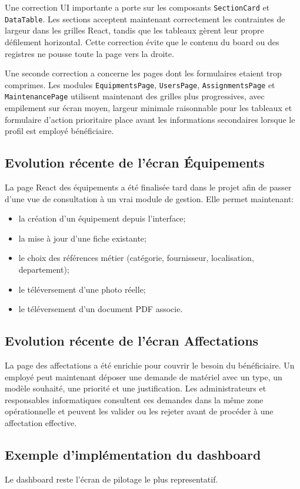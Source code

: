 Une correction UI importante a porte sur les composants \texttt{SectionCard} et \texttt{DataTable}. Les sections acceptent maintenant correctement les contraintes de largeur dans les grilles React, tandis que les tableaux gèrent leur propre défilement horizontal. Cette correction évite que le contenu du board ou des registres ne pousse toute la page vers la droite.

Une seconde correction a concerne les pages dont les formulaires etaient trop comprimes. Les modules \texttt{EquipmentsPage}, \texttt{UsersPage}, \texttt{AssignmentsPage} et \texttt{MaintenancePage} utilisent maintenant des grilles plus progressives, avec empilement sur écran moyen, largeur minimale raisonnable pour les tableaux et formulaire d'action prioritaire place avant les informations secondaires lorsque le profil est employé bénéficiaire.

\subsection{Evolution récente de l'écran Équipements}
La page React des équipements a été finalisée tard dans le projet afin de passer d'une vue de consultation à un vrai module de gestion. Elle permet maintenant:
\begin{itemize}
  \item la création d'un équipement depuis l'interface;
  \item la mise à jour d'une fiche existante;
  \item le choix des références métier (catégorie, fournisseur, localisation, departement);
  \item le téléversement d'une photo réelle;
  \item le téléversement d'un document PDF associe.
\end{itemize}

\subsection{Evolution récente de l'écran Affectations}
La page des affectations a été enrichie pour couvrir le besoin du bénéficiaire. Un employé peut maintenant déposer une demande de matériel avec un type, un modèle souhaité, une priorité et une justification. Les administrateurs et responsables informatiques consultent ces demandes dans la même zone opérationnelle et peuvent les valider ou les rejeter avant de procéder à une affectation effective.

\subsection{Exemple d'implémentation du dashboard}
Le dashboard reste l'écran de pilotage le plus representatif.

